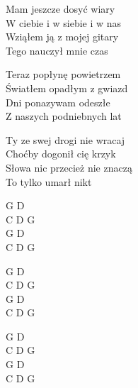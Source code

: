 \begin{text}
    Mam jeszcze dosyć wiary\\ 
    W ciebie i w siebie i w nas\\
    Wziąłem ją z mojej gitary\\
    Tego nauczył mnie czas

    Teraz popłynę powietrzem\\
    Światłem opadłym z gwiazd\\
    Dni ponazywam odeszłe\\
    Z naszych podniebnych lat

    Ty ze swej drogi nie wracaj\\
    Choćby dogonił cię krzyk\\
    Słowa nic przecież nie znaczą\\
    To tylko umarł nikt
\end{text}
\begin{chord}
    G D\\
    C D G\\
    G D\\
    C D G

    G D\\
    C D G\\
    G D\\
    C D G

    G D\\
    C D G\\
    G D\\
    C D G
\end{chord}
